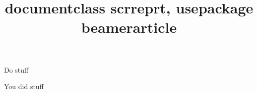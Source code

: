 \documentclass[12pt,a4paper,parskip=half]{scrreprt}
\title{documentclass scrreprt, usepackage beamerarticle}
\begin{document}
\begin{frame}[fragile]

    \begin{aufgabe}
        Do stuff
    \end{aufgabe}
    \begin{loesung}
        You did stuff
    \end{loesung}
\end{frame}
\end{document}
